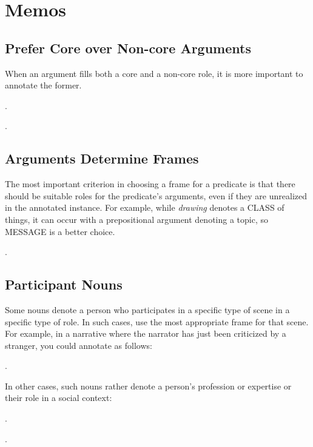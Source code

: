 \documentclass[a4paper]{article}
\newcommand{\fr}[1]{\textsf{#1}}
\newcommand{\rl}[1]{\textsf{#1}}
\begin{document}
\section{Memos}

\subsection{Prefer Core over Non-core Arguments}

When an argument fills both a core and a non-core role, it is more important to
annotate the former.

\ex.

\ex.

\subsection{Arguments Determine Frames}

The most important criterion in choosing a frame for a predicate is that there
should be suitable roles for the predicate's arguments, even if they are
unrealized in the annotated instance. For example, while \emph{drawing} denotes
a \fr{CLASS} of things, it can occur with a prepositional argument denoting a
\rl{topic}, so \fr{MESSAGE} is a better choice.

\ex.

\subsection{Participant Nouns}

Some nouns denote a person who participates in a specific type of scene in a
specific type of role. In such cases, use the most appropriate frame for that
scene. For example, in a narrative where the narrator has just been criticized
by a stranger, you could annotate as follows:

\ex.

In other cases, such nouns rather denote a person's profession or expertise or
their role in a social context:

\ex.

\ex.
\end{document}
